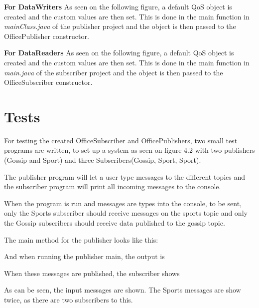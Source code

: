 \textbf{For DataWriters}
As seen on the following figure, a default QoS object is created and the custom values are then set. This is done in the main function in \textit{mainClass.java} of the publisher project and the object is then passed to the OfficePublisher constructor.
\begin{center}
\end{center}

\textbf{For DataReaders}
As seen on the following figure, a default QoS object is created and the custom values are then set. This is done in the main function in \textit{main.java} of the subscriber project and the object is then passed to the OfficeSubscriber constructor.
\begin{center}
\end{center}




\section{Tests}
For testing the created OfficeSubscriber and OfficePublishers, two small test programs are written, to set up a system as seen on figure 4.2 with two publishers (Gossip and Sport) and three Subscribers(Gossip, Sport, Sport). 

The publisher program will let a user type messages to the different topics and the subscriber program will print all incoming messages to the console.

When the program is run and messages are types into the console, to be sent, only the Sports subscriber should receive messages on the sports topic and only the Gossip subscribers should receive data published to the gossip topic. 

The main method for the publisher looks like this:

\begin{center}
\end{center}

And when running the publisher main, the output is 

\begin{center}
\end{center}

When these messages are published, the subscriber shows 

\begin{center}
\end{center}

As can be seen, the input messages are shown. The Sports messages are show twice, as there are two subscribers to this.